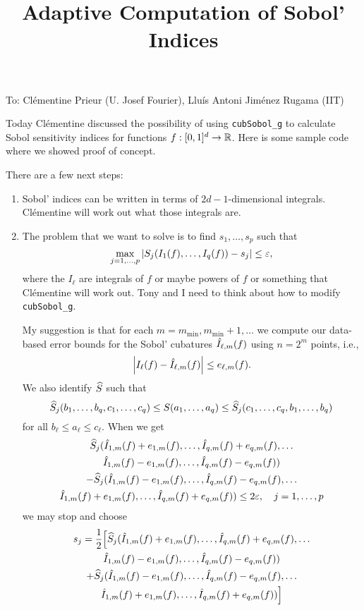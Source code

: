 \documentclass[]{amsart}
\newcommand{\oerr}{e}
\begin{document}
\title{Adaptive Computation of Sobol' Indices}
\maketitle

\noindent To:  Cl\'ementine Prieur (U. Josef Fourier), Llu\'is Antoni Jim\'enez Rugama (IIT)

\bigskip

Today Cl\'ementine discussed the possibility of using \texttt{cubSobol\_g} to calculate Sobol sensitivity indices for functions $f : [0,1]^d \to \mathbb{R}$.  Here is some sample code where we showed proof of concept.



There are a few next steps: 

\begin{enumerate}
\item Sobol' indices can be written in terms of $2d-1$-dimensional integrals.   Cl\'ementine will work out what those integrals are.

\item The problem that we want to solve is to find $s_1, \ldots, s_p$ such that 
\[
\max_{j=1, \ldots, p} \left \lvert S_j(I_1(f), \ldots, I_q(f)) - s_j \right \rvert \le \varepsilon,
\]
 where the $I_\ell$ are integrals of $f$ or maybe powers of $f$ or something that Cl\'ementine will work out.  Tony and I need to think about how to modify \texttt{cubSobol\_g}.
 
My suggestion is that for each $m = m_{\min}, m_{\min}+1, \ldots$ we compute our data-based error bounds for the Sobol' cubatures $\hat{I}_{\ell,m}(f)$ using $n=2^m$ points, i.e., 
\[
\abs{I_\ell(f) - \hI_{\ell,m}(f)} \le \oerr_{\ell,m}(f).
\]
We also identify $\widehat{S}$ such that 
\[
\widehat{S}_j(b_1, \ldots, b_q, c_1, \ldots, c_q) \le S(a_1, \ldots, a_q) \le \widehat{S}_j(c_1, \ldots, c_q, b_1, \ldots, b_q) 
\]
for all $b_\ell \le a_\ell \le c_\ell$.  When we get 
\begin{multline}\label{stopping_crit}
\hS_j(\hI_{1,m}(f) + \oerr_{1,m}(f), \ldots,\hI_{q,m}(f) + \oerr_{q,m}(f), \ldots \\
\hI_{1,m}(f) - \oerr_{1,m}(f), \ldots,\hI_{q,m}(f) - \oerr_{q,m}(f)) \\
 - \hS_j(\hI_{1,m}(f) - \oerr_{1,m}(f), \ldots,\hI_{q,m}(f) - \oerr_{q,m}(f), \ldots \\
 \hI_{1,m}(f) + \oerr_{1,m}(f), \ldots,\hI_{q,m}(f) + \oerr_{q,m}(f))   \le 2\varepsilon, \quad j = 1, \ldots, p
\end{multline}
we may stop and choose 
\begin{multline*}
s_j = \frac{1}{2}\Bigl[\hS_j(\hI_{1,m}(f) + \oerr_{1,m}(f), \ldots,\hI_{q,m}(f) + \oerr_{q,m}(f), \ldots \\
\hI_{1,m}(f) - \oerr_{1,m}(f), \ldots,\hI_{q,m}(f) - \oerr_{q,m}(f)) \\
+ \hS_j(\hI_{1,m}(f) - \oerr_{1,m}(f), \ldots,\hI_{q,m}(f) - \oerr_{q,m}(f), \ldots \\
 \hI_{1,m}(f) + \oerr_{1,m}(f), \ldots,\hI_{q,m}(f) + \oerr_{q,m}(f)) \Bigr]
 \end{multline*}
 

\end{enumerate}
\end{document}
